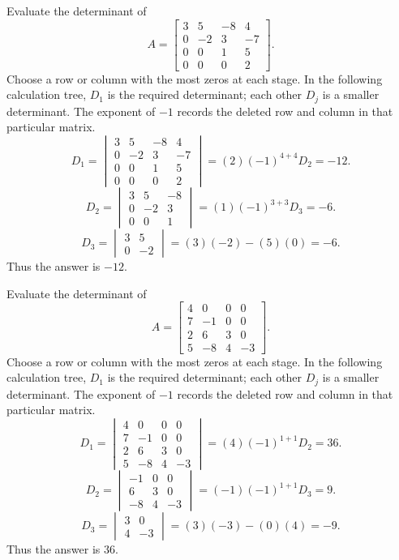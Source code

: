 \goal Evaluate the determinant of
\[A=\begin{bmatrix}3&5&-8&4\\0&-2&3&-7\\0&0&1&5\\0&0&0&2\end{bmatrix}.\]
Choose a row or column with the most zeros at each stage. In the following calculation tree, $D_{1}$ is the required determinant; each other $D_j$ is a smaller determinant. The exponent of $-1$ records the deleted row and column in that particular matrix.
\[
D_{1}=\begin{vmatrix}3&5&-8&4\\0&-2&3&-7\\0&0&1&5\\0&0&0&2\end{vmatrix}=(2)(-1)^{4+4}D_{2}=-12.
\]
\[
D_{2}=\begin{vmatrix}3&5&-8\\0&-2&3\\0&0&1\end{vmatrix}=(1)(-1)^{3+3}D_{3}=-6.
\]
\[
D_{3}=\begin{vmatrix}3&5\\0&-2\end{vmatrix}=(3)(-2)-(5)(0)=-6.
\]
Thus the answer is $-12$.

\goal Evaluate the determinant of
\[A=\begin{bmatrix}4&0&0&0\\7&-1&0&0\\2&6&3&0\\5&-8&4&-3\end{bmatrix}.\]
Choose a row or column with the most zeros at each stage. In the following calculation tree, $D_{1}$ is the required determinant; each other $D_j$ is a smaller determinant. The exponent of $-1$ records the deleted row and column in that particular matrix.
\[
D_{1}=\begin{vmatrix}4&0&0&0\\7&-1&0&0\\2&6&3&0\\5&-8&4&-3\end{vmatrix}=(4)(-1)^{1+1}D_{2}=36.
\]
\[
D_{2}=\begin{vmatrix}-1&0&0\\6&3&0\\-8&4&-3\end{vmatrix}=(-1)(-1)^{1+1}D_{3}=9.
\]
\[
D_{3}=\begin{vmatrix}3&0\\4&-3\end{vmatrix}=(3)(-3)-(0)(4)=-9.
\]
Thus the answer is $36$.


